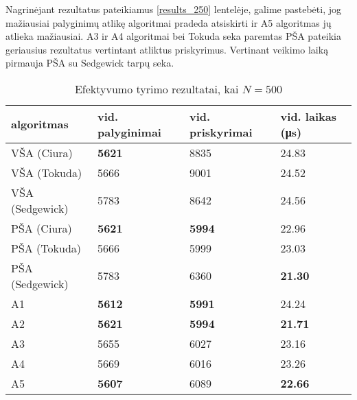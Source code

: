\documentclass{VUMIFInfKursinis}
\begin{document}
Nagrinėjant rezultatus pateikiamus \ref{results_250} lentelėje, galime pastebėti, jog
mažiausiai palyginimų atlikę algoritmai pradeda atsiskirti ir A5 algoritmas jų atlieka mažiausiai.
A3 ir A4 algoritmai bei Tokuda seka paremtas PŠA pateikia geriausius rezultatus vertintant atliktus priskyrimus.
Vertinant veikimo laiką pirmauja PŠA su Sedgewick tarpų seka.

\begin{table}[H]
  \caption{Efektyvumo tyrimo rezultatai, kai $N = 500$}
  \label{results_500}
  \centering
  \begin{tabular}{@{}llll@{}}
  algoritmas & vid. palyginimai                      & vid. priskyrimai                      & vid. laikas (μs)                       \\ \midrule
  VŠA (Ciura)       & \cellcolor[HTML]{70AD47}\textbf{5621} & 8835                                  & 24.83                                  \\
  VŠA (Tokuda)      & 5666                                  & 9001                                  & 24.52                                  \\
  VŠA (Sedgewick)       & 5783                                  & 8642                                  & 24.56                                  \\
  PŠA (Ciura)      & \cellcolor[HTML]{70AD47}\textbf{5621} & \cellcolor[HTML]{70AD47}\textbf{5994} & 22.96                                  \\
  PŠA (Tokuda)      & 5666                                  & 5999                                  & 23.03                                  \\
  PŠA (Sedgewick)      & 5783                                  & 6360                                  & \cellcolor[HTML]{70AD47}\textbf{21.30} \\
  A1      & \cellcolor[HTML]{70AD47}\textbf{5612} & \cellcolor[HTML]{70AD47}\textbf{5991} & 24.24                                  \\
  A2 & \cellcolor[HTML]{70AD47}\textbf{5621} & \cellcolor[HTML]{70AD47}\textbf{5994} & \cellcolor[HTML]{70AD47}\textbf{21.71} \\
  A3      & 5655                                  & 6027                                  & 23.16                                  \\
  A4      & 5669                                  & 6016                                  & 23.26                                  \\
  A5      & \cellcolor[HTML]{70AD47}\textbf{5607} & 6089                                  & \cellcolor[HTML]{70AD47}\textbf{22.66} \\  \bottomrule 
  \end{tabular}
\end{table}
\end{document}
